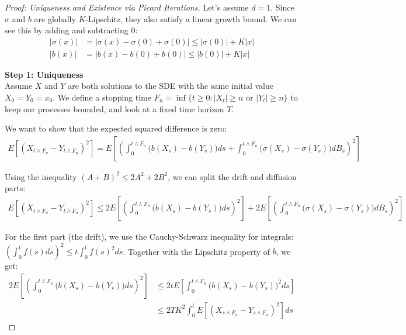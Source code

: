 \begin{proof}[Proof: Uniqueness and Existence via Picard Iterations]
    Let's assume $d=1$. Since $\sigma$ and $b$ are globally $K$-Lipschitz, they also satisfy a linear growth bound. We can see this by adding and subtracting $0$:
    \begin{align*}
        |\sigma(x)| &= |\sigma(x) - \sigma(0) + \sigma(0)| \leq |\sigma(0)| + K|x| \\
        |b(x)| &= |b(x) - b(0) + b(0)| \leq |b(0)| + K|x|
    \end{align*}

    \textbf{Step 1: Uniqueness} \\
    Assume $X$ and $Y$ are both solutions to the SDE with the same initial value $X_0 = Y_0 = x_0$. We define a stopping time $F_n = \inf\{t \geq 0 : |X_t| \geq n \text{ or } |Y_t| \geq n\}$ to keep our processes bounded, and look at a fixed time horizon $T$. 
    
    We want to show that the expected squared difference is zero:
    \begin{align*}
        E\left[(X_{t \wedge F_n} - Y_{t \wedge F_n})^2\right] = E \left[ \left( \int_0^{t \wedge F_n} \big(b(X_s) - b(Y_s)\big) ds + \int_0^{t \wedge F_n} \big(\sigma(X_s) - \sigma(Y_s)\big) dB_s \right)^2 \right]
    \end{align*}
    
    Using the inequality $(A+B)^2 \leq 2A^2 + 2B^2$, we can split the drift and diffusion parts:
    \begin{align*}
        E\left[(X_{t \wedge F_n} - Y_{t \wedge F_n})^2\right] \leq 2 E \left[ \left( \int_0^{t \wedge F_n} \big(b(X_s) - b(Y_s)\big) ds \right)^2 \right] + 2 E \left[ \left( \int_0^{t \wedge F_n} \big(\sigma(X_s) - \sigma(Y_s)\big) dB_s \right)^2 \right]
    \end{align*}

    For the first part (the drift), we use the Cauchy-Schwarz inequality for integrals: $\left(\int_0^t f(s) ds\right)^2 \leq t \int_0^t f(s)^2 ds$. Together with the Lipschitz property of $b$, we get:
    \begin{align*}
        2 E \left[ \left( \int_0^{t \wedge F_n} \big(b(X_s) - b(Y_s)\big) ds \right)^2 \right] 
        &\leq 2t E \left[ \int_0^{t \wedge F_n} \big(b(X_s) - b(Y_s)\big)^2 ds \right] \\
        &\leq 2T K^2 \int_0^t E \left[ (X_{s \wedge F_n} - Y_{s \wedge F_n})^2 \right] ds
    \end{align*}


\end{proof}
